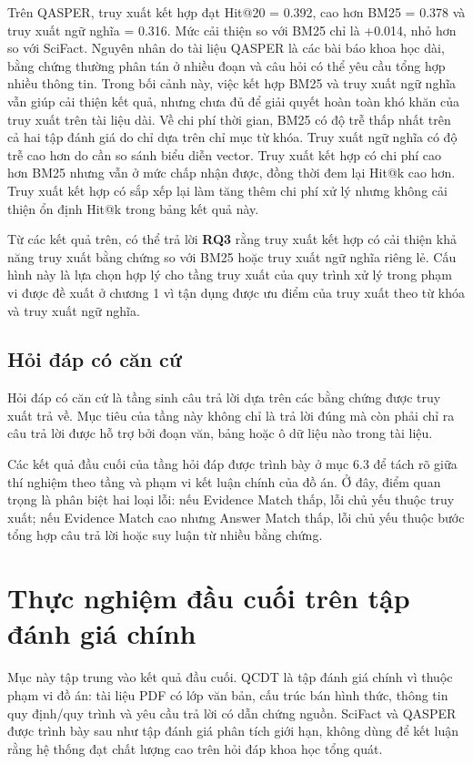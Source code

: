 \documentclass[../DoAn.tex]{subfiles}
\begin{document}
Trên QASPER, truy xuất kết hợp đạt Hit@20 = 0.392, cao hơn BM25 = 0.378 và truy xuất ngữ nghĩa = 0.316. Mức cải thiện so với BM25 chỉ là +0.014, nhỏ hơn so với SciFact. Nguyên nhân do  tài liệu QASPER là các bài báo khoa học dài, bằng chứng thường phân tán ở nhiều đoạn và câu hỏi có thể yêu cầu tổng hợp nhiều thông tin. Trong bối cảnh này, việc kết hợp BM25 và truy xuất ngữ nghĩa vẫn giúp cải thiện kết quả, nhưng chưa đủ để giải quyết hoàn toàn khó khăn của truy xuất trên tài liệu dài.
Về chi phí thời gian, BM25 có độ trễ thấp nhất trên cả hai tập đánh giá do chỉ dựa trên chỉ mục từ khóa. Truy xuất ngữ nghĩa có độ trễ cao hơn do cần so sánh biểu diễn vector. Truy xuất kết hợp có chi phí cao hơn BM25 nhưng vẫn ở mức chấp nhận được, đồng thời đem lại Hit@k cao hơn. Truy xuất kết hợp có sắp xếp lại làm tăng thêm chi phí xử lý nhưng không cải thiện ổn định Hit@k trong bảng kết quả này.

Từ các kết quả trên, có thể trả lời \textbf{RQ3} rằng truy xuất kết hợp có cải thiện khả năng truy xuất bằng chứng so với BM25 hoặc truy xuất ngữ nghĩa riêng lẻ. Cấu hình này là lựa chọn hợp lý cho tầng truy xuất của quy trình xử lý trong phạm vi được đề xuất ở chương 1 vì tận dụng được ưu điểm của truy xuất theo từ khóa và truy xuất ngữ nghĩa.



\subsection{Hỏi đáp có căn cứ}

Hỏi đáp có căn cứ là tầng sinh câu trả lời dựa trên các bằng chứng được truy xuất trả về. Mục tiêu của tầng này không chỉ là trả lời đúng mà còn phải chỉ ra câu trả lời được hỗ trợ bởi đoạn văn, bảng hoặc ô dữ liệu nào trong tài liệu.

Các kết quả đầu cuối của tầng hỏi đáp được trình bày ở mục 6.3 để tách rõ giữa thí nghiệm theo tầng và phạm vi kết luận chính của đồ án. Ở đây, điểm quan trọng là phân biệt hai loại lỗi: nếu Evidence Match thấp, lỗi chủ yếu thuộc truy xuất; nếu Evidence Match cao nhưng Answer Match thấp, lỗi chủ yếu thuộc bước tổng hợp câu trả lời hoặc suy luận từ nhiều bằng chứng.

\section{Thực nghiệm đầu cuối trên tập đánh giá chính}

Mục này tập trung vào kết quả đầu cuối. QCDT là tập đánh giá chính vì thuộc phạm vi đồ án: tài liệu PDF có lớp văn bản, cấu trúc bán hình thức, thông tin quy định/quy trình và yêu cầu trả lời có dẫn chứng nguồn. SciFact và QASPER được trình bày sau như tập đánh giá phân tích giới hạn, không dùng để kết luận rằng hệ thống đạt chất lượng cao trên hỏi đáp khoa học tổng quát.
\end{document}
